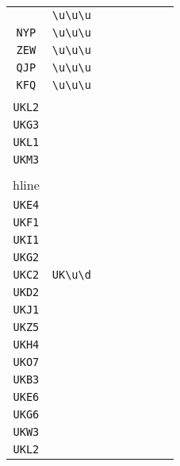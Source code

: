 \begin{longtable}{cccccccc}
\begin{tabular}{ll}
    \verb|HPC| & \verb|\u\u\u|\\
\verb|NYP| & \verb|\u\u\u|\\
\verb|ZEW| & \verb|\u\u\u|\\
\verb|QJP| & \verb|\u\u\u|\\
\verb|KFQ| & \verb|\u\u\u|
\end{tabular}
\\\midrule 
\begin{tabular}{l}
    \verb|UKC1|\\
\verb|UKL2|\\
\verb|UKG3|\\
\verb|UKL1|\\
\verb|UKM3|\\
\\hline\\
\verb|UKE4|\\
\verb|UKF1|\\
\verb|UKI1|\\
\verb|UKG2|\\
\verb|UKC2|
\end{tabular}

&
\verb|UK\u\d|
&

\begin{tabular}{l}
    \verb|UK\u\d|\\
\verb|UKD2|\\
\verb|UKJ1|\\
\verb|UKZ5|\\
\verb|UKH4|\\
\verb|UKO7|
\end{tabular}

&

\begin{tabular}{l}
    \verb|UK\u\d|\\
\verb|UKB3|\\
\verb|UKE6|\\
\verb|UKG6|\\
\verb|UKW3|\\
\verb|UKL2|
\end{tabular}

&


\end{longtable}
